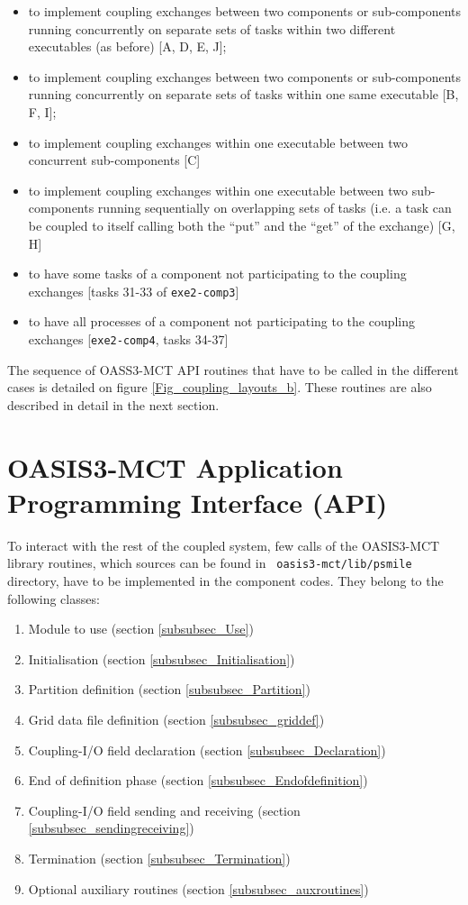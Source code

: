 \begin{itemize}

\item to implement coupling exchanges between two components or
  sub-components running concurrently on separate sets of tasks within two different executables  (as before) [A, D, E, J];
\item to implement coupling exchanges between two components or
  sub-components running concurrently on separate sets of tasks within one same executable [B, F, I];
\item to implement coupling exchanges within one executable between
  two concurrent sub-components [C] 
\item to implement coupling exchanges within one executable between
  two sub-components running sequentially on overlapping sets of tasks (i.e. a task can be coupled to itself calling both the ``put” and the ``get” of the exchange) [G, H]
\item to have some tasks of a component not participating to the coupling exchanges [tasks 31-33 of {\tt exe2-comp3}]
\item to have all processes of a component not participating to the coupling exchanges [{\tt exe2-comp4}, tasks 34-37]

\end{itemize}

The sequence of OASS3-MCT API routines that have to be called in the different cases is detailed on figure  \ref{Fig_coupling_layouts_b}.  These routines are also described in detail in the next section.

\section{OASIS3-MCT Application Programming Interface (API)}
\label{API}

To interact with the rest of the coupled system, few calls of the
OASIS3-MCT library routines, which sources can be found in {\tt
  oasis3-mct/lib/psmile} directory, have to be implemented in the
component codes. They belong to the following classes:
\begin{enumerate}
\item Module to use (section \ref{subsubsec_Use})
\item Initialisation (section \ref{subsubsec_Initialisation})
\item Partition definition (section \ref{subsubsec_Partition})
\item Grid data file definition (section \ref{subsubsec_griddef})
\item Coupling-I/O field declaration (section
  \ref{subsubsec_Declaration})
\item End of definition phase (section
  \ref{subsubsec_Endofdefinition})
\item Coupling-I/O field sending and receiving (section
  \ref{subsubsec_sendingreceiving})
\item Termination (section \ref{subsubsec_Termination})
\item Optional auxiliary routines (section
  \ref{subsubsec_auxroutines})
\end{enumerate}

